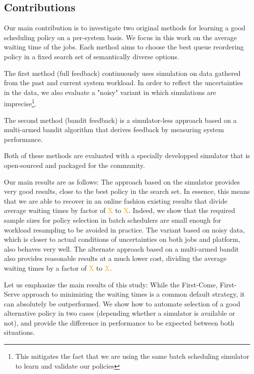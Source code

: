 \documentclass[sigconf,review]{acmart}
\begin{document}
\subsection{Contributions}

Our main contribution is to investigate two original methods for learning a
good scheduling policy on a per-system basis. We focus in this work on the
average waiting time of the jobs. Each method aims to choose the best queue
reordering policy in a fixed search set of semantically diverse options.

The first method (full feedback) continuously uses simulation on data gathered
from the past and current system workload. In order to reflect the
uncertainties in the data, we also evaluate a "noisy" variant in which
simulations are imprecise\footnote{This mitigates the fact that we are
using the same batch scheduling simulator to learn and validate our policies}.

The second method (bandit feedback) is a simulator-less approach based on a
multi-armed bandit algorithm that derives feedback by measuring system
performance.

Both of these methods are evaluated with a specially developped simulator that is
open-sourced and packaged for the community.

\bigskip

Our main results are as follows: The approach based on the simulator provides
very good results, close to the best policy in the search set. In essence, this
means that we are able to recover in an online fashion existing results that
divide average waiting times by factor of \textcolor{orange}{X} to
\textcolor{orange}{X}. Indeed, we show that the required sample sizes for
policy selection in batch schedulers are small enough for workload resampling to
be avoided in practice. The variant based on noisy data, which is closer to
actual conditions of uncertainties on both jobs and platform, also behaves very
well. The alternate approach based on a multi-armed bandit also provides
reasonable results at a much lower cost, dividing the average waiting times by
a factor of \textcolor{orange}{X} to \textcolor{orange}{X}.

Let us emphasize the main results of this study: While the First-Come,
First-Serve approach to minimizing the waiting times is a common default
strategy, it can absolutely be outperformed.  We show how to automate selection
of a good alternative policy in two cases (depending whether a simulator is
available or not), and provide the difference in performance to be expected
between both situations.
\end{document}
